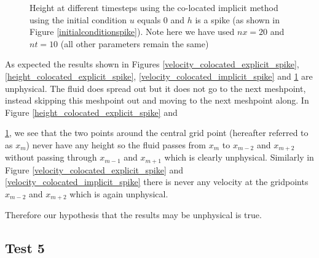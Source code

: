\documentclass[a4paper,12pt, notitlepage]{article}
\begin{document}
\begin{figure} [H]
\begin{minipage}{.5\textwidth}
		\caption{\label{height_colocated_implicit_spike} Height at different timesteps using the co-located implicit method using the initial condition $u$ equals 0 and $h$ is a spike (as shown in Figure \ref{initialconditionspike}). Note here we have used $nx = 20$ and $nt = 10$ (all other parameters remain the same)} 
	\end{minipage}
\end{figure}

As expected the results shown in Figures \ref{velocity_colocated_explicit_spike}, \ref{height_colocated_explicit_spike}, \ref{velocity_colocated_implicit_spike} and \ref{height_colocated_implicit_spike} are unphysical. The fluid does spread out but it does not go to the next meshpoint, instead skipping this meshpoint out and moving to the next meshpoint along. In Figure \ref{height_colocated_explicit_spike} and {\ref{height_colocated_implicit_spike}, we see that the two points around the central grid point (hereafter referred to as $x_{m}$) never have any height so the fluid passes from $x_{m}$ to $x_{m-2}$ and $x_{m+ 2}$ without passing through $x_{m-1}$ and $x_{m+1}$ which is clearly unphysical. Similarly in Figure \ref{velocity_colocated_explicit_spike} and \ref{velocity_colocated_implicit_spike} there is never any velocity at the gridpoints $x_{m-2}$ and $x_{m+2}$ which is again unphysical. 
	
Therefore our hypothesis that the results may be unphysical is true.

\subsection{Test 5}

}
\end{document}
